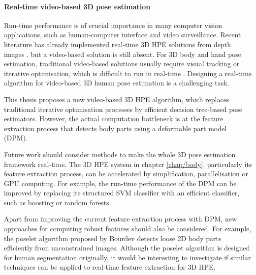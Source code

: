 \paragraph{Real-time video-based 3D pose estimation}
Run-time performance is of crucial importance in many computer vision applications, such as human-computer interface and video surveillance. Recent literature has already implemented real-time 3D HPE solutions from depth images \cite{Baak2011, Girshick2011, Sun2012}, but a video-based solution is still absent. For 3D body and hand pose estimation, traditional video-based solutions usually require visual tracking or iterative optimisation, which is difficult to run in real-time \cite{Pons-Moll2011, Sigal2012}. Designing a real-time algorithm for video-based 3D human pose estimation is a challenging task. 

This thesis proposes a new video-based 3D HPE algorithm, which replaces traditional iterative optimisation processes by efficient decision tree-based pose estimators. However, the actual computation bottleneck is at the feature extraction process that detects body parts using a deformable part model (DPM). 

Future work should consider methods to make the whole 3D pose estimation framework real-time. 
The 3D HPE system in chapter \ref{chap/body}, particularly its feature extraction process, can be accelerated by simplification, parallelisation or GPU computing. 
For example, the run-time performance of the DPM can be improved by replacing its structured SVM classifier \cite{Yang2011} with an efficient classifier, such as boosting or random forests.

Apart from improving the current feature extraction process with DPM, new approaches for computing robust features should also be considered. 
For example, the poselet algorithm proposed by Bourdev \etal \cite{Bourdev2009} detects loose 2D body parts efficiently from unconstrained images. Although the poselet algorithm is designed for human segmentation originally, it would be interesting to investigate if similar techniques can be applied to real-time feature extraction for 3D HPE. 

